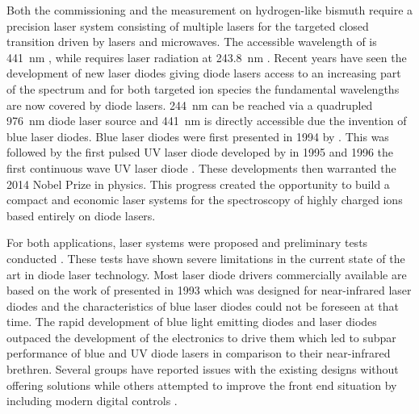 Both the commissioning and the measurement on hydrogen-like bismuth require a precision laser system consisting of multiple lasers for the targeted closed transition driven by lasers and microwaves. The accessible wavelength of  is \qty{441}{\nm} \cite{ar13+_wavelength}, while  requires laser radiation at \qty{243.8}{\nm} \cite{bi82+_wavelength}. Recent years have seen the development of new laser diodes giving diode lasers access to an increasing part of the spectrum and for both targeted ion species the fundamental wavelengths are now covered by diode lasers. \qty{244}{\nm} can be reached via a quadrupled \qty{976}{\nm} diode laser source and \qty{441}{\nm} is directly accessible due the invention of blue laser diodes. Blue laser diodes were first presented in 1994 by \citeauthor{Nakamura_1996} \cite{Nakamura_1996}. This was followed by the first pulsed UV laser diode developed by \citeauthor{uv_pulsed_laser_diode_first} \cite{uv_pulsed_laser_diode_first} in 1995 and 1996 the first continuous wave UV laser diode \cite{uv_cw_laser_diode_first}. These developments then warranted the 2014 Nobel Prize in physics. This progress created the opportunity to build a compact and economic laser systems for the spectroscopy of highly charged ions based entirely on diode lasers.

For both applications, laser systems were proposed and preliminary tests conducted \cite{thesis_baus,thesis_alex,thesis_tilman,thesis_seppo}. These tests have shown severe limitations in the current state of the art in diode laser technology. Most laser diode drivers commercially available are based on the work of \citeauthor{libbrecht_hall} presented in 1993 \cite{libbrecht_hall} which was designed for near-infrared laser diodes and the characteristics of blue laser diodes could not be foreseen at that time. The rapid development of blue light emitting diodes and laser diodes outpaced the development of the electronics to drive them which led to subpar performance of blue and UV diode lasers in comparison to their near-infrared brethren. Several groups have reported issues with the existing designs \cite{laser_driver_mosfet_noise} without offering solutions while others attempted to improve the front end situation by including modern digital controls \cite{laser_driver_digital}.

